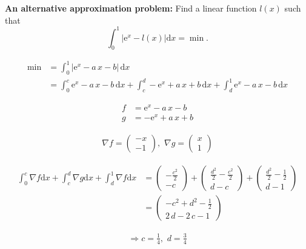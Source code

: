 \textbf{An alternative approximation problem:}
Find a linear function $l(x)$ such that
\[
\int_0^1 |\mathrm{e}^x - l(x)| \text{d}x = \min.
\]

{\color{blue}

\[
\begin{aligned}
\min &= \int_0^1 |\mathrm{e}^x - a\, x - b| \,\text{d}x \\
&= \int_0^c \mathrm{e}^x - a\, x - b \,\text{d}x +
\int_c^d -\mathrm{e}^x + a\, x + b \,\text{d}x +
\int_d^1 \mathrm{e}^x - a\, x - b \,\text{d}x
\end{aligned}
\]

\[
\begin{aligned}
f &= \mathrm{e}^x - a\, x - b \\
g &= -\mathrm{e}^x + a\, x + b
\end{aligned}
\]

\[
\begin{aligned}
\nabla f = \left(\begin{array}{c} - x\\ -1 \end{array}\right), \,\,
\nabla g = \left(\begin{array}{c} x\\ 1 \end{array}\right)
\end{aligned}
\]

\[
\begin{aligned}
 \int_0^c \nabla f \text{d}x +
\int_c^d \nabla g \text{d}x +
\int_d^1 \nabla f \text{d}x
&= \left(\begin{array}{c} - \frac{c^2}{2}\\ - c \end{array}\right) +
\left(\begin{array}{c} \frac{d^2}{2} - \frac{c^2}{2}\\ d -
  c \end{array}\right) +
\left(\begin{array}{c} \frac{d^2}{2} - \frac{1}{2}\\ d -
  1 \end{array}\right) \\
&= \left(\begin{array}{c}  - c^2 + d^2 - \frac{1}{2}\\ 2\, d - 2\, c - 1 \end{array}\right)
\end{aligned}
\]

\[
\begin{aligned}
\Rightarrow c = \frac{1}{4},\,\, d = \frac{3}{4}
\end{aligned}
\]

}
